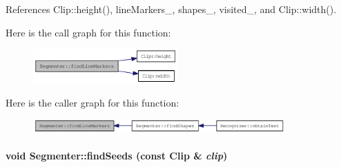 References Clip::height(), lineMarkers\_\-, shapes\_\-, visited\_\-, and Clip::width().

Here is the call graph for this function:\nopagebreak
\begin{figure}[H]
\begin{center}
\leavevmode
\includegraphics[width=157pt]{class_segmenter_ad8893282742e811dd7fff172ec03c85_cgraph}
\end{center}
\end{figure}


Here is the caller graph for this function:\nopagebreak
\begin{figure}[H]
\begin{center}
\leavevmode
\includegraphics[width=274pt]{class_segmenter_ad8893282742e811dd7fff172ec03c85_icgraph}
\end{center}
\end{figure}
\hypertarget{class_segmenter_bacab187b543a51c5322c01fc0a29ffb}{
\paragraph[{findSeeds}]{\setlength{\rightskip}{0pt plus 5cm}void Segmenter::findSeeds (const {\bf Clip} \& {\em clip})}\hfill}
\label{class_segmenter_bacab187b543a51c5322c01fc0a29ffb}


